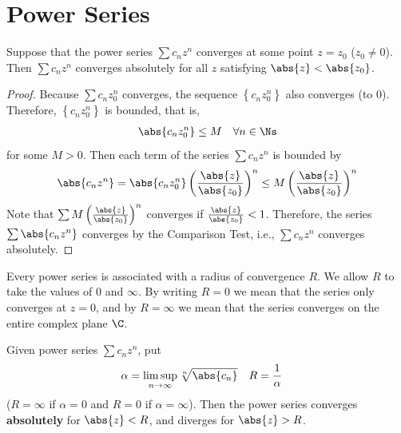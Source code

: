 \documentclass[thmcnt=section, 12pt]{elegantbook}
\begin{document}

\section{Power Series}


\begin{lemma} \label{lem:2} %
    Suppose that the power series $\sum c_n z^n$ converges at some point $z = z_0$ ($z_0 \neq 0$). Then $\sum c_n z^n$ converges absolutely for all $z$ satisfying $\abs{z} < \abs{z_0}$.
\end{lemma}

\begin{proof}
    Because $\sum c_n z_0^n$ converges, the sequence $\left\{c_n z_0^n\right\}$ also converges (to $0$). Therefore, $\left\{c_n z_0^n\right\}$ is bounded, that is,  
    \begin{align*}
        \abs{c_n z_0^n} \leq M
        \quad \forall n \in \Ns
    \end{align*}
    for some $M > 0$. Then each term of the series $\sum c_n z^n$ is bounded by 
    \begin{align*}
        \abs{c_n z^n}
        = \abs{c_n z_0^n} \left(\frac{\abs{z}}{\abs{z_0}}\right)^n
        \leq M \left(\frac{\abs{z}}{\abs{z_0}}\right)^n
    \end{align*}
    Note that $\sum M \left(\frac{\abs{z}}{\abs{z_0}}\right)^n$ converges if $\frac{\abs{z}}{\abs{z_0}} < 1$. Therefore, the series $\sum \abs{c_n z^n}$ converges by the Comparison Test, i.e., $\sum c_n z^n$ converges absolutely.
\end{proof}


\par Every power series is associated with a radius of convergence $R$. We allow $R$ to take the values of $0$ and $\infty$. By writing $R = 0$ we mean that the series only converges at $z = 0$, and by $R = \infty$ we mean that the series converges on the entire complex plane $\C$.

\begin{theorem} \label{thm:13}
    Given power series $\sum c_n z^n$, put
    \begin{align*}
        \alpha &= \limsup_{n \to \infty} \sqrt[n]{\abs{c_n}} & R &= \frac{1}{\alpha}
    \end{align*}
    ($R = \infty$ if $\alpha = 0$ and $R = 0$ if $\alpha = \infty$). Then the power series converges \textbf{absolutely} for $\abs{z} < R$, and diverges for $\abs{z} > R$. 
\end{theorem}
\end{document}
